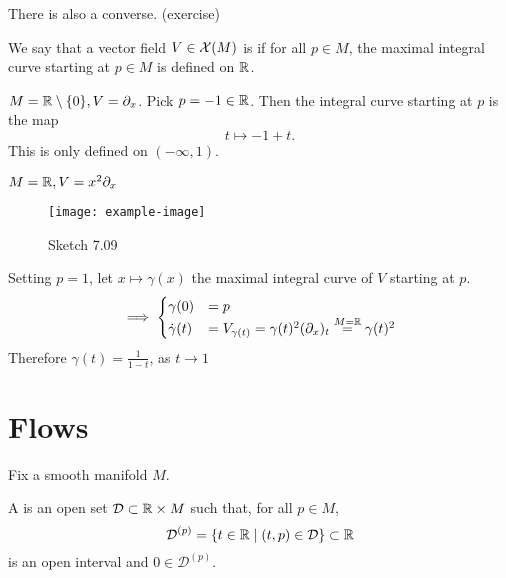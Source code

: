 \begin{remark}
    There is also a converse. (exercise)
\end{remark}

\begin{definition*}
    We say that a vector field \(V\in \mathcal{X}(M)\) is  if for all 
    \(p\in M\), the maximal integral curve starting at \(p\in M\) is defined on \(\mathbb{R}\).
\end{definition*}

\begin{example}
    \(M=\mathbb{R}\setminus\{0\},V=\partial_x\). Pick \(p=-1\in \mathbb{R}\). Then the integral curve starting at 
    \(p\) is the map
    \[t\mapsto -1 +t.\]
    This is only defined on \((-\infty,1)\).
\end{example}

\begin{example}
    \(M=\mathbb{R},V=x^2\partial_x\)
    \begin{figure}[H]\label{fig:7.09}
        \centering
        \texttt{[image: example-image]}
        \caption{Sketch 7.09}
    \end{figure}
    Setting \(p=1\), let \(x\mapsto \gamma(x)\) the maximal integral curve of \(V\) starting at \(p\).
    \[\implies \begin{cases}
        \gamma(0)&=p\\
        \dot{\gamma}(t)&=V_{\gamma(t)}=\gamma(t)^2(\partial_x)_{t}\stackrel{M=\mathbb{R}}{=}\gamma(t)^2
    \end{cases}\]
    Therefore \(\gamma(t)=\frac{1}{1-t}\), as \(t\to 1\)
\end{example}

\section{Flows}

Fix a smooth manifold \(M\).

\begin{definition*}
    A  is an open set \(\mathcal{D}\subset\mathbb{R}\times M\) such that,
    for all \(p\in M\),
    \[\mathcal{D}^{(p)}=\{t\in \mathbb{R}\mid (t,p)\in \mathcal{D}\}\subset\mathbb{R}\]
    is an open interval and \(0\in \mathcal{D}^{(p)}\).
\end{definition*}

